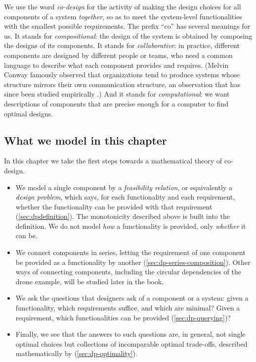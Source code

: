 We use the word \emph{co-design} for the activity of making the design choices for all components of a system \emph{together}, so as to meet the system-level functionalities with the smallest possible requirements.
The prefix ``co'' has several meanings for us.
It stands for \emph{compositional}: the design of the system is obtained by composing the designs of its components.
It stands for \emph{collaborative}: in practice, different components are designed by different people or teams, who need a common language to describe what each component provides and requires.
(Melvin Conway famously observed that organizations tend to produce systems whose structure mirrors their own communication structure, an observation that has since been studied empirically \cite{maccormack12exploring}.)
And it stands for \emph{computational}: we want descriptions of components that are precise enough for a computer to find optimal designs.

\subsection{What we model in this chapter}

In this chapter we take the first steps towards a mathematical theory of co-design.
\begin{itemize}
    \item We model a single component by a \emph{feasibility relation}, or equivalently a \emph{design problem}, which says, for each functionality and each requirement, whether the functionality can be provided with that requirement (\cref{sec:dpdefinition}).
          The monotonicity described above is built into the definition.
          We do not model \emph{how} a functionality is provided, only \emph{whether} it can be.
    \item We connect components in series, letting the requirement of one component be provided as a functionality by another (\cref{sec:dp-series-composition}).
          Other ways of connecting components, including the circular dependencies of the drone example, will be studied later in the book.
    \item We ask the questions that designers ask of a component or a system: given a functionality, which requirements suffice, and which are minimal? Given a requirement, which functionalities can be provided (\cref{sec:dp-querying})?
    \item Finally, we see that the answers to such questions are, in general, not single optimal choices but collections of incomparable optimal trade-offs, described mathematically by  (\cref{sec:dp-optimality}).
\end{itemize}
